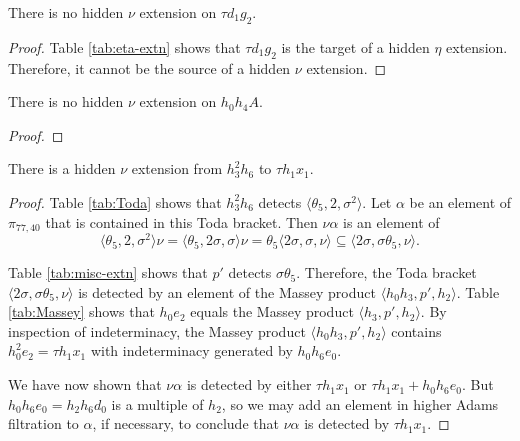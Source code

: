 \begin{lemma}
\label{lem:nu-td1g2}
There is no hidden $\nu$ extension on $\tau d_1 g_2$.
\end{lemma}

\begin{proof}
Table \ref{tab:eta-extn} shows that $\tau d_1 g_2$ is the target
of a hidden $\eta$ extension.  Therefore, it cannot be the source
of a hidden $\nu$ extension.
\end{proof}

\begin{lemma}
\label{lem:nu-h0h4A}
There is no hidden $\nu$ extension on $h_0 h_4 A$.
\end{lemma}

\begin{proof}
\end{proof}

\begin{lemma}
\label{lem:nu-h3^2h6}
There is a hidden $\nu$ extension from $h_3^2 h_6$ to $\tau h_1 x_1$.
\end{lemma}

\begin{proof}
Table \ref{tab:Toda} shows that
$h_3^2 h_6$ detects
$\langle \theta_5, 2, \sigma^2 \rangle$.
Let $\alpha$ be an element of $\pi_{77,40}$ that is contained
in this Toda bracket.
Then $\nu \alpha$ is an element of
\[
\langle \theta_5, 2, \sigma^2 \rangle \nu =
\langle \theta_5, 2 \sigma, \sigma \rangle \nu =
\theta_5 \langle 2 \sigma, \sigma, \nu \rangle \subseteq
\langle 2 \sigma, \sigma \theta_5, \nu \rangle.
\]

Table \ref{tab:misc-extn} shows that $p'$ detects 
$\sigma \theta_5$.
Therefore, the Toda bracket
$\langle 2 \sigma, \sigma \theta_5, \nu \rangle$
is detected by an element of the Massey product
$\langle h_0 h_3, p', h_2 \rangle$.
Table \ref{tab:Massey} shows that $h_0 e_2$ equals the
Massey product $\langle h_3, p', h_2\rangle$. 
By inspection of indeterminacy,
the Massey product $\langle h_0 h_3, p', h_2 \rangle$
contains $h_0^2 e_2 = \tau h_1 x_1$ with indeterminacy generated by
$h_0 h_6 e_0$.

We have now shown that 
$\nu \alpha$ is detected by either
$\tau h_1 x_1$ or $\tau h_1 x_1 + h_0 h_6 e_0$.
But $h_0 h_6 e_0 = h_2 h_6 d_0$ is a multiple of $h_2$,
so we may add an element in higher Adams filtration to $\alpha$,
if necessary, to conclude that $\nu \alpha$ is detected by
$\tau h_1 x_1$. 
\end{proof}

